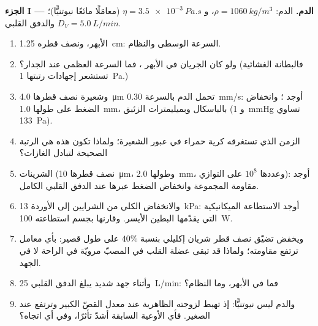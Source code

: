 \begin{problem}
\label{pb:b2:viscous-flows:1}

\medskip
\noindent\textbf{الجزء I --- الدم.}
الدم: $\rho = \qty{1060}{kg/m^3}$، و $\eta = \qty{3.5e-3}{Pa.s}$ (معامَلًا
مائعًا نيوتنيًّا)؛ والدفق القلبي $D_V = \qty{5.0}{L/min}$.
\begin{enumerate}
  \item الأبهر، ونصف قطره \qty{1.25}{cm}: السرعة الوسطى  والنظام.
  \item ولو كان الجريان في الأبهر ، فما السرعة
        العظمى  عند الجدار؟ (فالبطانة الغشائية
        تستشعر إجهادات رتبتها \qty{1}{Pa}.)
  \item وشعيرة نصف قطرها \qty{4.0}{\micro m} تحمل الدم بالسرعة
        \qty{0.30}{mm/s}: أوجد ؛ وانخفاض الضغط على
        طولها \qty{1.0}{mm}، بالباسكال وبميليمترات الزئبق
        (و \qty{1}{mmHg} تساوي \qty{133}{Pa}).
  \item الزمن الذي تستغرقه كرية حمراء في عبور الشعيرة؛ ولماذا
        تكون هذه هي الرتبة الصحيحة لتبادل الغازات؟
  \item الشرينات (نصف قطرها \qty{10}{\micro m}، وطولها \qty{2.0}{mm}، وعددها $10^8$
        على التوازي): أوجد مقاومة المجموعة وانخفاض الضغط
        عبرها عند الدفق القلبي الكامل.
  \item والانخفاض الكلي من الشرايين إلى الأوردة \qty{13}{kPa}: أوجد
        الاستطاعة الميكانيكية التي يقدّمها البطين الأيسر. وقارنها
        بجسم استطاعته \qty{100}{W}.
  \item ويخفض تضيّق نصف قطر شريان إكليلي بنسبة $40\%$
        على طول قصير: بأي معامل ترتفع مقاومته؛ ولماذا قد تبقى
        عضلة القلب في المصبّ مرويّة في الراحة لا في الجهد.
  \item وأثناء جهد شديد يبلغ الدفق القلبي \qty{25}{L/min}:
        فما  في الأبهر، وما النظام؟
  \item والدم ليس نيوتنيًّا: إذ تهبط لزوجته الظاهرية عند معدل
        القصّ الكبير وترتفع عند الصغير. فأي الأوعية السابقة
        أشدّ تأثرًا، وفي أي اتجاه؟
\end{enumerate}


\end{problem}
